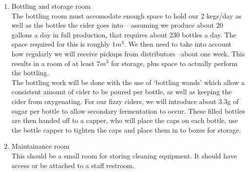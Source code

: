 \documentclass[11pt]{article}
\begin{document}
\begin{enumerate}
  \item Bottling and storage room \\
The bottling room must accomodate enough space to hold our 2 kegs/day as well as the bottles the cider goes into -- assuming we produce about 20 gallons a day in full production, that requires about 230 bottles a day. The space required for this is roughly $1m^3$. We then need to take into account how regularly we will receive pickups from distributors --about one week. This results in a room of at least $7m^3$ for storage, plus space to actually perform the bottling. \\
The bottling work will be done with the use of `bottling wands' which allow a consistent amount of cider to be poured per bottle, as well as keeping the cider from oxygenating. For our fizzy ciders, we will introduce about 3.3g of sugar per bottle to allow secondary fermentation to occur. These filled bottles are then handed off to a capper, who will place the caps on each bottle, use the bottle capper to tighten the caps and place them in to boxes for storage.

  \item Maintainance room\\
  This should be a small room for storing cleaning equipment. It should have access or be attached to a staff restroom.
  \end{enumerate}
\end{document}
